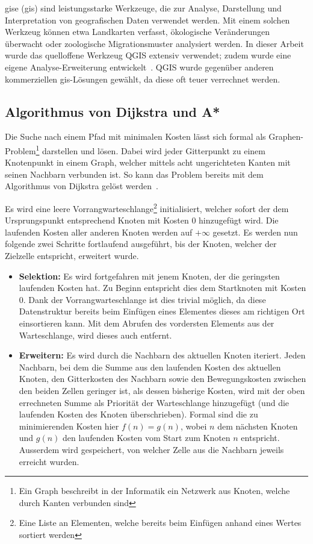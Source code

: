 \acrlong{gis}e (\acrshort{gis}) sind leistungsstarke Werkzeuge, die zur Analyse, Darstellung und Interpretation von geografischen Daten verwendet werden. Mit einem solchen Werkzeug können etwa Landkarten verfasst, ökologische Veränderungen überwacht oder zoologische Migrationsmuster analysiert werden.
In dieser Arbeit wurde das quelloffene Werkzeug QGIS extensiv verwendet; zudem wurde eine eigene Analyse-Erweiterung entwickelt~\cite{qgis}. QGIS wurde gegenüber anderen kommerziellen \gls{gis}-Lösungen gewählt, da diese oft teuer verrechnet werden.

\subsection{Algorithmus von Dijkstra und A*}

Die Suche nach einem Pfad mit minimalen Kosten lässt sich formal als Graphen-Problem\footnote{Ein Graph beschreibt in der Informatik ein Netzwerk aus Knoten, welche durch Kanten verbunden sind} darstellen und lösen. Dabei wird jeder Gitterpunkt zu einem Knotenpunkt in einem Graph, welcher mittels acht ungerichteten Kanten mit seinen Nachbarn verbunden ist. So kann das Problem bereits mit dem Algorithmus von Dijkstra gelöst werden~\cite{dijkstra1959note}.

Es wird eine leere Vorrangwarteschlange\footnote{Eine Liste an Elementen, welche bereits beim Einfügen anhand eines Wertes sortiert werden} initialisiert, welcher sofort der dem Ursprungspunkt entsprechend Knoten mit Kosten 0 hinzugefügt wird. Die laufenden Kosten aller anderen Knoten werden auf $+ \infty$ gesetzt. Es werden nun  folgende zwei Schritte fortlaufend ausgeführt, bis der Knoten, welcher der Zielzelle entspricht, erweitert wurde.~\cite{dijkstra1959note}
\begin{itemize}
  \item \textbf{Selektion:} Es wird fortgefahren mit jenem Knoten, der die geringsten laufenden Kosten hat. Zu Beginn entspricht dies dem Startknoten mit Kosten 0. Dank der Vorrangwarteschlange ist dies trivial möglich, da diese Datenstruktur bereits beim Einfügen eines Elementes dieses am richtigen Ort einsortieren kann. Mit dem Abrufen des vordersten Elements aus der Warteschlange, wird dieses auch entfernt.~\cite{dijkstra1959note}
  \item \textbf{Erweitern:} Es wird durch die Nachbarn des aktuellen Knoten iteriert. Jeden Nachbarn, bei dem die Summe aus den laufenden Kosten des aktuellen Knoten, den Gitterkosten des Nachbarn sowie den Bewegungskosten zwischen den beiden Zellen geringer ist, als dessen bisherige Kosten, wird mit der oben errechneten Summe als Priorität der Warteschlange hinzugefügt (und die laufenden Kosten des Knoten überschrieben). Formal sind die zu minimierenden Kosten hier $f(n)=g(n)$, wobei $n$ dem nächsten Knoten und $g(n)$ den laufenden Kosten vom Start zum Knoten $n$ entspricht. Ausserdem wird gespeichert, von welcher Zelle aus die Nachbarn jeweils erreicht wurden.~\cite{dijkstra1959note}
\end{itemize}

